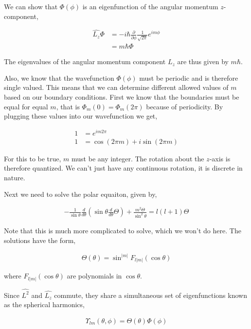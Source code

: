 \documentclass[11pt]{amsart}
\begin{document}
We can show that $\Phi(\phi)$ is an eigenfunction of the angular momentum $z$-component,

\begin{align*}
  \hat{L_z}\Phi &= -i\hbar\frac{\partial}{\partial\phi}\frac{1}{\sqrt{2\pi}}e^{im\phi} \\
                &= m\hbar\Phi
\end{align*}

The eigenvalues of the angular momentum component $L_z$ are thus given by $m\hbar$.

Also, we know that the wavefunction $\Phi(\phi)$ must be periodic and is therefore single valued. This means that we can determine different allowed values of $m$ based on our boundary conditions. First we know that the boundaries must be equal for equal $m$, that is $\Phi_m(0)=\Phi_m(2\pi)$ because of periodicity. By plugging these values into our wavefunction we get,

\begin{align*}
  1 &= e^{im 2\pi} \\
  1 &= \cos(2\pi m) + i\sin(2\pi m)
\end{align*}

For this to be true, $m$ must be any integer. The rotation about the $z$-axis is therefore quantized. We can't just have any continuous rotation, it is discrete in nature.

Next we need to solve the polar equaiton, given by,

\begin{align*}
-\frac{1}{\sin{\theta}}\frac{d}{d\theta}\left(\sin{\theta}\frac{d}{d\theta}\Theta\right) + \frac{m^2\Theta}{\sin^2{\theta}} = l(l+1)\Theta
\end{align*}

Note that this is much more complicated to solve, which we won't do here. The solutions have the form,

\begin{align*}
  \Theta(\theta) = \sin^{|m|}F_{l|m|}(\cos{\theta})
\end{align*}

where $F_{l|m|}(\cos{\theta})$ are polynomials in $\cos{\theta}$.

Since $\hat{L^2}$ and $\hat{L_z}$ commute, they share a simultaneous set of eigenfunctions known as the spherical harmonics,

\begin{align*}
  \Upsilon_{lm}(\theta,\phi)=\Theta(\theta)\Phi(\phi)
\end{align*}
\end{document}
